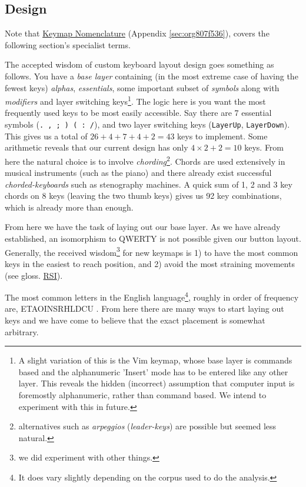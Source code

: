 \documentclass[logo,bsc,singlespacing,parskip]{infthesis}
\begin{document}
\subsection{Design}
\label{sec:orgeeae4e6}
Note that \hyperref[sec:org807f536]{Keymap Nomenclature} (Appendix \ref{sec:org807f536}), covers the following section's specialist terms.

The accepted wisdom of custom keyboard layout design goes something as follows.
You have a \emph{base layer} containing (in the most extreme case of having the fewest keys) \emph{alphas}, \emph{essentials}, some important subset of \emph{symbols} along with \emph{modifiers} and layer switching keys\footnote{A slight variation of this is the Vim \autocite{WelcomeHomeVim} keymap, whose base layer is commands based and the alphanumeric 'Insert' mode has to be entered like any other layer. This reveals the hidden (incorrect) assumption that computer input is foremostly alphanumeric, rather than command based. We intend to experiment with this in future.}.
The logic here is you want the most frequently used keys to be most easily accessible.
Say there are 7 essential symbols (\texttt{. , ; ) ( : /}), and two layer switching keys (\texttt{LayerUp}, \texttt{LayerDown}).
This gives us a total of \(26+4+7+4+2=43\) keys to implement.
Some arithmetic reveals that our current design has only \(4\times2 + 2 = 10\) keys.
From here the natural choice is to involve \emph{chording}\footnote{alternatives such as \emph{arpeggios} (\emph{leader-keys}) are possible but seemed less natural.}.
Chords are used extensively in musical instruments (such as the piano) and there already exist successful \emph{chorded-keyboards} such as stenography machines.
A quick sum of 1, 2 and 3 key chords on 8 keys (leaving the two thumb keys) gives us 92 key combinations, which is already more than enough.

From here we have the task of laying out our base layer.
As we have already established, an isomorphism to QWERTY is not possible given our button layout.
Generally, the received wisdom\footnote{we did experiment with other things.} for new keymaps is 1) to have the most common keys in the easiest to reach position, and 2) avoid the most straining movements (see gloss. \hyperref[org77f0234]{RSI}).

The most common letters in the English language\footnote{It does vary slightly depending on the corpus used to do the analysis.}, roughly in order of frequency are, ETAOINSRHLDCU \autocite{norvigEnglishLetterFrequency}.
From here there are many ways to start laying out keys and we have come to believe that the exact placement is somewhat arbitrary.
\end{document}
